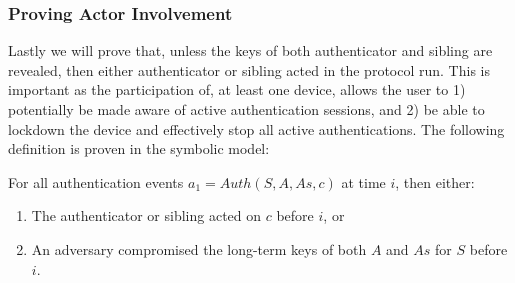 \subsubsection{Proving Actor Involvement}\label{sec:involvement}

Lastly we will prove that, unless the keys of both \gls{authenticator} and \gls{sibling} are revealed, then either \gls{authenticator} or \gls{sibling} acted in the protocol run. This is important as the participation of, at least one device, allows the user to 1) potentially be made aware of active authentication sessions, and 2) be able to lockdown the device and effectively stop all active authentications. The following definition is proven in the symbolic model:

\begin{theorem}
For all authentication events $a_1 = Auth(S,A,As,c)$ at time $i$, then either:
\begin{enumerate}
    \item The \gls{authenticator} or \gls{sibling} acted on $c$ before $i$, or 
    \item An adversary compromised the long-term keys of both $A$ and $As$ for $S$ before $i$.
\end{enumerate}
\end{theorem}

\begin{comment}

\begin{itemize}
\item Authentication\_Possible (exists-trace): verified (7 steps)
\item Unforgeability\_Weak\_External\_Observation (all-traces): verified (16 steps)
\item Unforgeability\_Strong\_External\_Observation (all-traces): verified (61 steps)
\item Unforgeability\_Weak\_Internal\_Observation (all-traces): verified (21 steps)
\item Unforgeability\_Strong\_Internal\_Observation (all-traces): falsified - found trace (8 steps)
\item Unforgeability\_Strong\_Internal\_Observation\_Only\_Authentic (all-traces): verified (21 steps)
\item Unforgeability\_Without\_Devices\_Only\_If\_Both\_Compromised (all-traces): verified (74 steps)
\item Client\_Auth\_Injective (all-traces): verified (25 steps)    
\end{itemize}

\end{comment}


